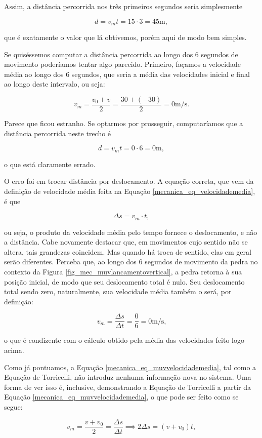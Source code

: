 Assim, a distância percorrida nos três primeiros segundos seria simplesmente

$$d=v_mt=15\cdot 3 = 45 \text{m},$$

\noindent que é exatamente o valor que lá obtivemos, porém aqui de modo bem simples.

Se quiséssemos computar a distância percorrida ao longo dos 6 segundos de movimento poderíamos tentar algo parecido. Primeiro, façamos a velocidade média ao longo dos 6 segundos, que seria a média das velocidades inicial e final ao longo deste intervalo, ou seja:

$$  v_m=\dfrac{v_0+v}{2}=\dfrac{30+(-30)}{2}= 0 \text{m/s}.$$

Parece que ficou estranho. Se optarmos por prosseguir, computaríamos que a distância percorrida neste trecho é

$$ d=v_m t = 0 \cdot 6 = 0 \text{m},$$

\noindent o que está claramente errado.

O erro foi em trocar distância por deslocamento. A equação correta, que vem da definição de velocidade média feita na Equação \eqref{mecanica_eq_velocidademedia}, é que 

$$ \Delta s = v_m \cdot t,$$

\noindent ou seja, o produto da velocidade média pelo tempo fornece o deslocamento, e não a distância. Cabe novamente destacar que, em movimentos cujo sentido não se altera, tais grandezas coincidem. Mas quando há troca de sentido, elas em geral serão diferentes. Perceba que, ao longo dos 6 segundos de movimento da pedra no contexto da Figura \ref{fig_mec_muvlancamentovertical}, a pedra retorna à sua posição inicial, de modo que seu deslocamento total é nulo. Seu deslocamento total sendo zero, naturalmente, sua velocidade média também o será, por definição:

$$ v_m=\dfrac{\Delta s}{\Delta t}= \dfrac{0}{6}=0 \text{m/s,}$$

\noindent o que é condizente com o cálculo obtido pela média das velocidades feito logo acima.



Como já pontuamos, a Equação \eqref{mecanica_eq_muvvelocidademedia}, tal como a Equação de Torricelli, não introduz nenhuma informação nova no sistema. Uma forma de ver isso é, inclusive, demonstrando a Equação de Torricelli a partir da Equação \eqref{mecanica_eq_muvvelocidademedia}, o que pode ser feito como se segue:

$$ v_m = \dfrac{v+v_0}{2} = \dfrac{\Delta s}{\Delta t} \implies 2 \Delta s = (v + v_0)t,$$


